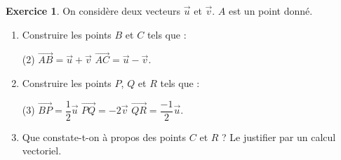 \documentclass{exam}
\theoremstyle{definition}
\newtheorem{exercice}{Exercice}
\begin{document}
%             
% 
\begin{center}
\end{center}

\begin{exercice}{}{}
On considère deux vecteurs $\vec u$ et $\vec v$. $A$ est un point donné.
\begin{enumerate}[label=\arabic*.]
\item Construire les points $B$ et $C$ tels que :
  \begin{tasks}[label=\textbullet](2)
  \task $\overrightarrow{AB}=\vec u+\vec v$
  \task $\overrightarrow{AC}=\vec u-\vec v$.
  \end{tasks}
\item Construire les points $P$, $Q$ et $R$ tels que :
  \begin{tasks}[label=\textbullet](3)
  \task $\overrightarrow{BP}=\dfrac12\vec u$
  \task $\overrightarrow{PQ}=-2\vec v$
  \task $\overrightarrow{QR}=\dfrac{-1}{2}\vec u$.
  \end{tasks}
\item Que constate-t-on à propos des points $C$ et $R$ ? Le justifier par un calcul vectoriel.
\end{enumerate}
\end{exercice}
\end{document}
